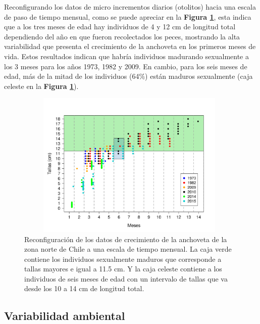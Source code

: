 \documentclass[letter,11pt]{article}
\begin{document}
Reconfigurando los datos de micro incrementos diarios (otolitos) hacia
una escala de paso de tiempo mensual, como se puede apreciar en la
\textbf{Figura \ref{Fig4}}, esta indica que a los tres meses de edad hay
individuos de 4 y 12 cm de longitud total dependiendo del a\~{n}o en que
fueron recolectados los peces, mostrando la alta variabilidad que
presenta el crecimiento de la anchoveta en los primeros meses de vida.
Estos resultados indican que habr\'ia individuos madurando sexualmente a
los 3 meses para los a\~{n}os 1973, 1982 y 2009. En cambio, para los seis
meses de edad, m\'as de la mitad de los individuos (64\%) est\'an maduros
sexualmente (caja celeste en la \textbf{Figura \ref{Fig4}}).

\vspace{0.5cm}
\begin{figure}[htb!]
 \centering
 \includegraphics[width=11cm,height=7cm]{Figuras/figura4.pdf}
 \caption{Reconfiguraci\'on de los datos de crecimiento de la anchoveta de la zona norte de Chile a una escala de tiempo mensual. La caja verde contiene los individuos sexualmente maduros que corresponde a tallas mayores e igual a 11.5 cm. Y la caja celeste contiene a los individuos de seis meses de edad con un intervalo de tallas que va desde los 10 a 14 cm de longitud total.}
 \label{Fig4}
\end{figure}


\subsection{Variabilidad ambiental}
\end{document}
